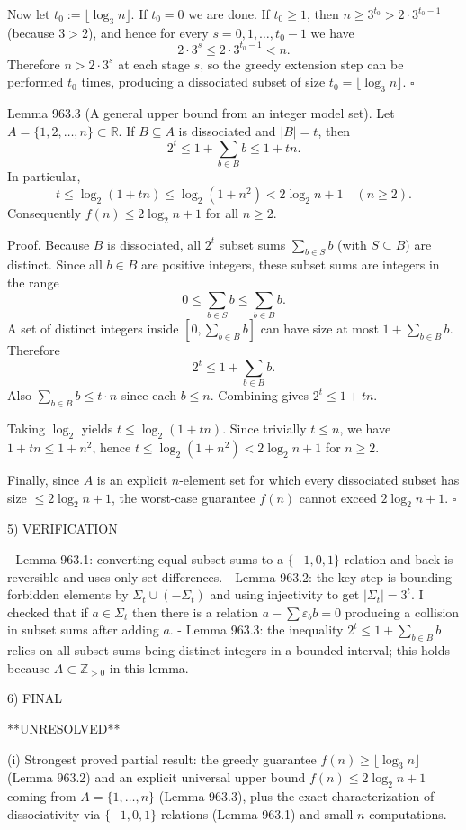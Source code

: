 Now let $t_0:=\lfloor\log_3 n\rfloor$. If $t_0=0$ we are done. If $t_0\ge 1$, then $n\ge 3^{t_0}>2\cdot 3^{t_0-1}$ (because $3>2$), and hence for every $s=0,1,\dots,t_0-1$ we have
\[
2\cdot 3^s \le 2\cdot 3^{t_0-1} < n.
\]
Therefore $n>2\cdot 3^s$ at each stage $s$, so the greedy extension step can be performed $t_0$ times, producing a dissociated subset of size $t_0=\lfloor\log_3 n\rfloor$. $\square$

Lemma 963.3 (A general upper bound from an integer model set).
Let $A=\{1,2,\dots,n\}\subset\mathbb R$. If $B\subseteq A$ is dissociated and $|B|=t$, then
\[
2^t \le 1+ \sum_{b\in B} b \le 1+ tn.
\]
In particular,
\[
 t\le \log_2(1+tn) \le \log_2(1+n^2) < 2\log_2 n + 1\quad (n\ge 2).
\]
Consequently $f(n)\le 2\log_2 n +1$ for all $n\ge 2$.

Proof.
Because $B$ is dissociated, all $2^t$ subset sums $\sum_{b\in S} b$ (with $S\subseteq B$) are distinct. Since all $b\in B$ are positive integers, these subset sums are integers in the range
\[
0 \le \sum_{b\in S}b \le \sum_{b\in B} b.
\]
A set of distinct integers inside $[0,\sum_{b\in B} b]$ can have size at most $1+\sum_{b\in B} b$. Therefore
\[
2^t \le 1+\sum_{b\in B} b.
\]
Also $\sum_{b\in B} b\le t\cdot n$ since each $b\le n$. Combining gives $2^t\le 1+tn$.

Taking $\log_2$ yields $t\le \log_2(1+tn)$. Since trivially $t\le n$, we have $1+tn\le 1+n^2$, hence $t\le \log_2(1+n^2)<2\log_2 n +1$ for $n\ge 2$.

Finally, since $A$ is an explicit $n$-element set for which every dissociated subset has size $\le 2\log_2 n+1$, the worst-case guarantee $f(n)$ cannot exceed $2\log_2 n+1$. $\square$

5) VERIFICATION

- Lemma 963.1: converting equal subset sums to a $\{-1,0,1\}$-relation and back is reversible and uses only set differences.
- Lemma 963.2: the key step is bounding forbidden elements by $\Sigma_t\cup(-\Sigma_t)$ and using injectivity to get $|\Sigma_t|=3^t$.
  I checked that if $a\in\Sigma_t$ then there is a relation $a-\sum \varepsilon_b b=0$ producing a collision in subset sums after adding $a$.
- Lemma 963.3: the inequality $2^t\le 1+\sum_{b\in B}b$ relies on all subset sums being distinct integers in a bounded interval; this holds because $A\subset\mathbb Z_{>0}$ in this lemma.

6) FINAL

**UNRESOLVED**

(i) Strongest proved partial result: the greedy guarantee $f(n)\ge \lfloor\log_3 n\rfloor$ (Lemma 963.2) and an explicit universal upper bound $f(n)\le 2\log_2 n+1$ coming from $A=\{1,\dots,n\}$ (Lemma 963.3), plus the exact characterization of dissociativity via $\{-1,0,1\}$-relations (Lemma 963.1) and small-$n$ computations.

